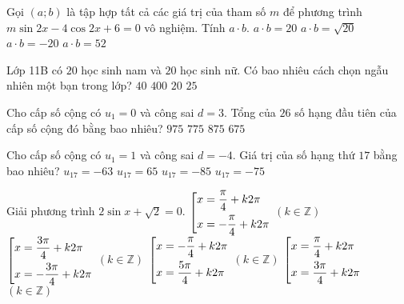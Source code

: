 \begin{ex}%
	Gọi $(a;b)$ là tập hợp tất cả các giá trị của tham số $m$ để phương trình $m\sin 2x-4\cos 2x +6=0$ vô nghiệm. Tính $a\cdot b$.
	\choice
	{$a\cdot b=20$}
	{$a\cdot b=\sqrt{20}$}
	{\True $a\cdot b=-20$}
	{$a\cdot b=52$}
\end{ex}

\begin{ex}%
	Lớp 11B có $20$ học sinh nam và $20$ học sinh nữ. Có bao nhiêu cách chọn ngẫu nhiên một bạn trong lớp?
	\choice
	{\True $40$}
	{$400$}
	{$20$}
	{$25$}
\end{ex}

\begin{ex}%
	Cho cấp số cộng có $u_1=0$ và công sai $d=3$. Tổng của $26$ số hạng đầu tiên của cấp số cộng đó bằng bao nhiêu?
	\choice
	{\True $975$}
	{$775$}
	{$875$}
	{$675$}
\end{ex}

\begin{ex}%
	Cho cấp số cộng có $u_1=1$ và công sai $d=-4$. Giá trị của số hạng thứ $17$ bằng bao nhiêu?
	\choice
	{\True $u_{17}=-63$}
	{$u_{17}=65$}
	{$u_{17}=-85$}
	{$u_{17}=-75$}
\end{ex}

\begin{ex}%
	Giải phương trình $2\sin x +\sqrt{2}=0$.
	\choice
	{$\left[\begin{aligned}&x=\dfrac{\pi}{4}+k2\pi\\&x=-\dfrac{\pi}{4}+k2\pi\end{aligned}\right.$ $(k \in \mathbb{Z})$}
	{$\left[\begin{aligned}&x=\dfrac{3\pi}{4}+k2\pi\\&x=-\dfrac{3\pi}{4}+k2\pi\end{aligned}\right.$ $(k \in \mathbb{Z})$}
	{\True $\left[\begin{aligned}&x=-\dfrac{\pi}{4}+k2\pi\\&x=\dfrac{5\pi}{4}+k2\pi\end{aligned}\right.$ $(k \in \mathbb{Z})$}
	{$\left[\begin{aligned}&x=\dfrac{\pi}{4}+k2\pi\\&x=\dfrac{3\pi}{4}+k2\pi\end{aligned}\right.$ $(k \in \mathbb{Z})$}
\end{ex}

